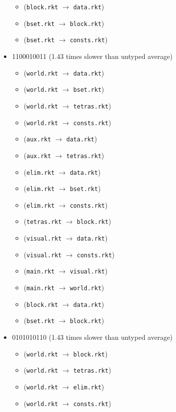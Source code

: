 \documentclass{article}
\newcommand{\mono}[1]{\texttt{#1}}
\begin{document}
\begin{itemize}
\begin{itemize}
  \item (\mono{block.rkt} $\rightarrow$ \mono{data.rkt})
  \item (\mono{bset.rkt} $\rightarrow$ \mono{block.rkt})
  \item (\mono{bset.rkt} $\rightarrow$ \mono{consts.rkt})
  \end{itemize}
\item 1100010011 (1.43 times slower than untyped average)
  \begin{itemize}
  \item (\mono{world.rkt} $\rightarrow$ \mono{data.rkt})
  \item (\mono{world.rkt} $\rightarrow$ \mono{bset.rkt})
  \item (\mono{world.rkt} $\rightarrow$ \mono{tetras.rkt})
  \item (\mono{world.rkt} $\rightarrow$ \mono{consts.rkt})
  \item (\mono{aux.rkt} $\rightarrow$ \mono{data.rkt})
  \item (\mono{aux.rkt} $\rightarrow$ \mono{tetras.rkt})
  \item (\mono{elim.rkt} $\rightarrow$ \mono{data.rkt})
  \item (\mono{elim.rkt} $\rightarrow$ \mono{bset.rkt})
  \item (\mono{elim.rkt} $\rightarrow$ \mono{consts.rkt})
  \item (\mono{tetras.rkt} $\rightarrow$ \mono{block.rkt})
  \item (\mono{visual.rkt} $\rightarrow$ \mono{data.rkt})
  \item (\mono{visual.rkt} $\rightarrow$ \mono{consts.rkt})
  \item (\mono{main.rkt} $\rightarrow$ \mono{visual.rkt})
  \item (\mono{main.rkt} $\rightarrow$ \mono{world.rkt})
  \item (\mono{block.rkt} $\rightarrow$ \mono{data.rkt})
  \item (\mono{bset.rkt} $\rightarrow$ \mono{block.rkt})
  \end{itemize}
\item 0101010110 (1.43 times slower than untyped average)
  \begin{itemize}
  \item (\mono{world.rkt} $\rightarrow$ \mono{block.rkt})
  \item (\mono{world.rkt} $\rightarrow$ \mono{tetras.rkt})
  \item (\mono{world.rkt} $\rightarrow$ \mono{elim.rkt})
  \item (\mono{world.rkt} $\rightarrow$ \mono{consts.rkt})

\end{itemize}
\end{itemize}
\end{document}
